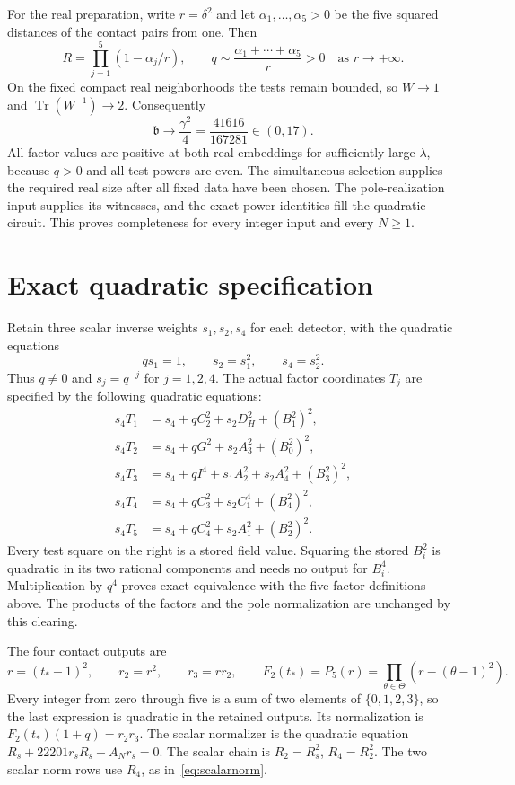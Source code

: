 \documentclass[11pt,a4paper]{article}
\DeclareMathOperator{\Tr}{Tr}\DeclareMathOperator{\Nm}{Nm}
\begin{document}
For the real preparation, write $r=\delta^2$ and let
$\alpha_1,\ldots,\alpha_5>0$ be the five squared distances of the
contact pairs from one. Then
\[
 R=\prod_{j=1}^{5}(1-\alpha_j/r),\qquad
 q\sim\frac{\alpha_1+\cdots+\alpha_5}r>0
 \quad\text{as }r\longrightarrow+\infty.
\]
On the fixed compact real neighborhoods the tests remain bounded, so
$W\to1$ and $\Tr(W^{-1})\to2$. Consequently
\[
              \mathfrak b\longrightarrow\frac{\gamma^2}{4}
                              =\frac{41616}{167281}\in(0,17).
\]
All factor values are positive at both real embeddings for sufficiently
large $\lambda$, because $q>0$ and all test powers are even.
The simultaneous selection supplies the required real size after all
fixed data have been chosen. The pole-realization input supplies its
witnesses, and the exact power identities fill the quadratic circuit.
This proves completeness for every integer input and every $N\ge1$.

\section{Exact quadratic specification}
Retain three scalar inverse weights $s_1,s_2,s_4$ for each detector,
with the quadratic equations
\begin{equation}\label{eq:inverseweights}
                 qs_1=1,\qquad s_2=s_1^2,\qquad s_4=s_2^2.
\end{equation}
Thus $q\ne0$ and $s_j=q^{-j}$ for $j=1,2,4$. The actual factor
coordinates $T_j$ are specified by the following quadratic equations:
\begin{equation}\label{eq:clearedfactors}
\begin{split}
 s_4T_1&=s_4+qC_2^2+s_2D_H^2+(B_1^2)^2,\\
 s_4T_2&=s_4+qG^2+s_2A_3^2+(B_0^2)^2,\\
 s_4T_3&=s_4+qI^4+s_1A_2^2+s_2A_4^2+(B_3^2)^2,\\
 s_4T_4&=s_4+qC_3^2+s_2C_1^4+(B_4^2)^2,\\
 s_4T_5&=s_4+qC_4^2+s_2A_1^2+(B_2^2)^2.
\end{split}
\end{equation}
Every test square on the right is a stored field value. Squaring
the stored $B_i^2$ is quadratic in its two rational components and
needs no output for $B_i^4$. Multiplication by $q^4$ proves exact
equivalence with the five factor definitions above. The products of
the factors and the pole normalization are unchanged by this clearing.

The four contact outputs are
\[
 r=(t_*-1)^2,\qquad r_2=r^2,\qquad r_3=rr_2,\qquad
 F_2(t_*)=P_5(r)=\prod_{\theta\in\Theta}(r-(\theta-1)^2).
\]
Every integer from zero through five is a sum of two elements of
$\{0,1,2,3\}$, so the last expression is quadratic in the retained
outputs. Its normalization is $F_2(t_*)(1+q)=r_2r_3$.
The scalar normalizer is the quadratic equation
$R_s+22201r_sR_s-A_Nr_s=0$.
The scalar chain is $R_2=R_s^2$, $R_4=R_2^2$.
The two scalar norm rows use $R_4$, as in~\eqref{eq:scalarnorm}.
\end{document}
